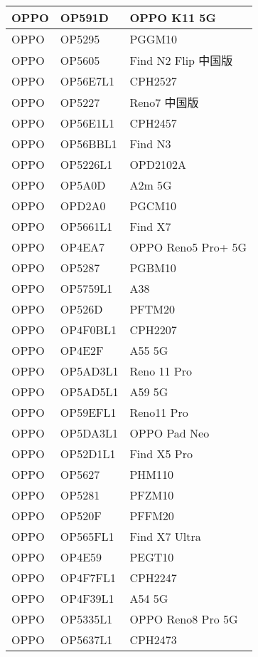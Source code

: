 \begin{tabularx}{\linewidth}{|l|X|X|}
        OPPO & OP591D & OPPO K11 5G \\ \hline
        OPPO & OP5295 & PGGM10 \\ \hline
        OPPO & OP5605 & Find N2 Flip 中国版 \\ \hline
        OPPO & OP56E7L1 & CPH2527 \\ \hline
        OPPO & OP5227 & Reno7 中国版 \\ \hline
        OPPO & OP56E1L1 & CPH2457 \\ \hline
        OPPO & OP56BBL1 & Find N3 \\ \hline
        OPPO & OP5226L1 & OPD2102A \\ \hline
        OPPO & OP5A0D & A2m 5G \\ \hline
        OPPO & OPD2A0 & PGCM10 \\ \hline
        OPPO & OP5661L1 & Find X7 \\ \hline
        OPPO & OP4EA7 & OPPO Reno5 Pro+ 5G \\ \hline
        OPPO & OP5287 & PGBM10 \\ \hline
        OPPO & OP5759L1 & A38 \\ \hline
        OPPO & OP526D & PFTM20 \\ \hline
        OPPO & OP4F0BL1 & CPH2207 \\ \hline
        OPPO & OP4E2F & A55 5G \\ \hline
        OPPO & OP5AD3L1 & Reno 11 Pro \\ \hline
        OPPO & OP5AD5L1 & A59 5G \\ \hline
        OPPO & OP59EFL1 & Reno11 Pro \\ \hline
        OPPO & OP5DA3L1 & OPPO Pad Neo \\ \hline
        OPPO & OP52D1L1 & Find X5 Pro \\ \hline
        OPPO & OP5627 & PHM110 \\ \hline
        OPPO & OP5281 & PFZM10 \\ \hline
        OPPO & OP520F & PFFM20 \\ \hline
        OPPO & OP565FL1 & Find X7 Ultra \\ \hline
        OPPO & OP4E59 & PEGT10 \\ \hline
        OPPO & OP4F7FL1 & CPH2247 \\ \hline
        OPPO & OP4F39L1 & A54 5G \\ \hline
        OPPO & OP5335L1 & OPPO Reno8 Pro 5G \\ \hline
        OPPO & OP5637L1 & CPH2473 \\ \hline

\end{tabularx}
